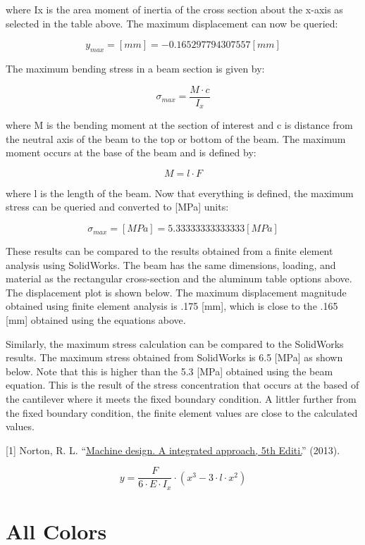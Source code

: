 \documentclass[
  a4paper,
]{article}
\begin{document}
where Ix is the area moment of inertia of the cross section about the
x-axis as selected in the table above. The maximum displacement can now
be queried:

\[\boxed{ y_{max}=\left[mm\right] =-0.165297794307557 \left[mm\right]  }\]

The maximum bending stress in a beam section is given by:

\[ \sigma_{max}=\frac{M\cdot c}{I_{x}}   \]

where M is the bending moment at the section of interest and c is
distance from the neutral axis of the beam to the top or bottom of the
beam. The maximum moment occurs at the base of the beam and is defined
by:

\[ M=l\cdot F   \]

where l is the length of the beam. Now that everything is defined, the
maximum stress can be queried and converted to {[}MPa{]} units:

\[\boxed{ \sigma_{max}=\left[MPa\right] =5.33333333333333 \left[MPa\right]  }\]

These results can be compared to the results obtained from a finite
element analysis using SolidWorks. The beam has the same dimensions,
loading, and material as the rectangular cross-section and the aluminum
table options above. The displacement plot is shown below. The maximum
displacement magnitude obtained using finite element analysis is .175
{[}mm{]}, which is close to the .165 {[}mm{]} obtained using the
equations above.

Similarly, the maximum stress calculation can be compared to the
SolidWorks results. The maximum stress obtained from SolidWorks is 6.5
{[}MPa{]} as shown below. Note that this is higher than the 5.3
{[}MPa{]} obtained using the beam equation. This is the result of the
stress concentration that occurs at the based of the cantilever where it
meets the fixed boundary condition. A littler further from the fixed
boundary condition, the finite element values are close to the
calculated values.

{[}1{]} Norton, R. L.
``\href{https://www.pearson.com/us/higher-education/program/Norton-Machine-Design-5th-Edition/PGM275676.html}{Machine
design. A integrated approach, 5th Editi.}'' (2013).

\[ y=\frac{F}{6\cdot E\cdot I_{x}}\cdot\left(x^{3}-3\cdot l\cdot x^{2}\right)   \]

\section{All Colors}\label{all-colors}
\end{document}
